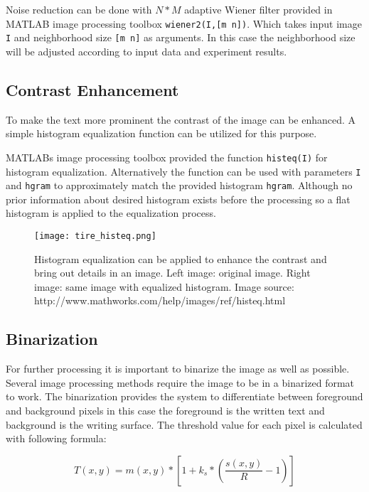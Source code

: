 \documentclass{article}
\def\code#1{\texttt{#1}}
\begin{document}
          Noise reduction can be done with $N * M$ adaptive Wiener filter provided in MATLAB image processing toolbox \code{wiener2(I,[m n])}. Which takes input image \code{I} and neighborhood size \code{[m n]} as arguments. In this case the neighborhood size will be adjusted according to input data and experiment results.

        \subsection{Contrast Enhancement}
          To make the text more prominent the contrast of the image can be enhanced. A simple histogram equalization function can be utilized for this purpose.

          MATLABs image processing toolbox provided the function \code{histeq(I)} for histogram equalization. Alternatively the function can be used with parameters \code{I} and \code{hgram} to approximately match the provided histogram \code{hgram}. Although no prior information about desired histogram exists before the processing so a flat histogram is applied to the equalization process.

          \begin{figure}[!ht]
            \centering
            \texttt{[image: tire\_histeq.png]}
            \caption{Histogram equalization can be applied to enhance the contrast and bring out details in an image. Left image: original image. Right image: same image with equalized histogram. Image source: http://www.mathworks.com/help/images/ref/histeq.html \label{fig:histeq} }
          \end{figure}

        \subsection{Binarization}
          For further processing it is important to binarize the image as well as possible. Several image processing methods require the image to be in a binarized format to work. The binarization provides the system to differentiate between foreground and background pixels in this case the foreground is the written text and background is the writing surface. The threshold value for each pixel is calculated with following formula:

          \begin{equation}
            T(x,y) = m(x,y)*\left[1+k_s*\left(\frac{s(x,y)}{R}-1\right)\right]
          \end{equation}
\end{document}
